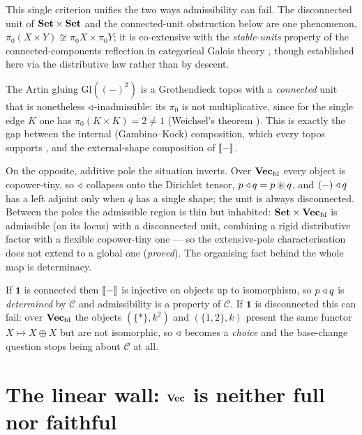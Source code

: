 This single criterion unifies the two ways admissibility can fail. The
disconnected unit of $\mathbf{Set}\times\mathbf{Set}$ and the connected-unit obstruction below are
one phenomenon, $\pi_0(X\times Y)\not\cong\pi_0 X\times\pi_0 Y$; it is co-extensive
with the \emph{stable-units} property of the connected-components reflection in
categorical Galois theory \cite{Xarez}, though established here via the
distributive law rather than by descent.

\begin{theorem}\label{thm:cob-gluing}
The Artin gluing $\mathrm{Gl}((-)^2)$ is a Grothendieck topos with a
\emph{connected} unit that is nonetheless $\triangleleft$-inadmissible: its $\pi_0$ is not
multiplicative, since for the single edge $K$ one has $\pi_0(K\times K)=2\neq1$
(Weichsel's theorem \cite{Weichsel}). This is exactly the gap between the internal
(Gambino--Kock) composition, which every topos supports \cite{GambinoKock}, and
the external-shape composition of $\llbracket - \rrbracket$.
\end{theorem}

On the opposite, additive pole the situation inverts. Over $\mathbf{Vec}_{\mathrm{fd}}$
every object is copower-tiny, so $\triangleleft$ collapses onto the Dirichlet tensor,
$p\triangleleft q=p\circledast q$, and $(-)\triangleleft q$ has a left adjoint only when $q$ has a single
shape; the unit is always disconnected. Between the poles the admissible region is
thin but inhabited: $\mathbf{Set}\times\mathbf{Vec}_{\mathrm{fd}}$ is admissible (on its locus)
with a disconnected unit, combining a rigid distributive factor with a flexible
copower-tiny one --- so the extensive-pole characterisation does not extend to a
global one (\emph{proved}). The organising fact behind the whole map is
determinacy.

\begin{theorem}\label{thm:cob-determinacy}
If $\mathbf{1}$ is connected then $\llbracket - \rrbracket$ is injective on objects up to
isomorphism, so $p\triangleleft q$ is \emph{determined} by $\mathcal{C}$ and admissibility
is a property of $\mathcal{C}$. If $\mathbf{1}$ is disconnected this can fail: over
$\mathbf{Vec}_{\mathrm{fd}}$ the objects $(\{*\},k^2)$ and $(\{1,2\},k)$ present the same
functor $X\mapsto X\oplus X$ but are not isomorphic, so $\triangleleft$ becomes a
\emph{choice} and the base-change question stops being about $\mathcal{C}$ at all.
\end{theorem}

\section{The linear wall: $\mathbf{Vec}$ is neither full nor faithful}
\label{sec:cob-vec}

